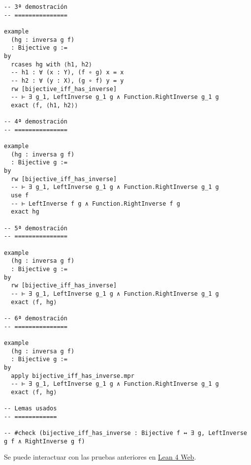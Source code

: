 \begin{verbatim}
-- 3ª demostración
-- ===============

example
  (hg : inversa g f)
  : Bijective g :=
by
  rcases hg with ⟨h1, h2⟩
  -- h1 : ∀ (x : Y), (f ∘ g) x = x
  -- h2 : ∀ (y : X), (g ∘ f) y = y
  rw [bijective_iff_has_inverse]
  -- ⊢ ∃ g_1, LeftInverse g_1 g ∧ Function.RightInverse g_1 g
  exact ⟨f, ⟨h1, h2⟩⟩

-- 4ª demostración
-- ===============

example
  (hg : inversa g f)
  : Bijective g :=
by
  rw [bijective_iff_has_inverse]
  -- ⊢ ∃ g_1, LeftInverse g_1 g ∧ Function.RightInverse g_1 g
  use f
  -- ⊢ LeftInverse f g ∧ Function.RightInverse f g
  exact hg

-- 5ª demostración
-- ===============

example
  (hg : inversa g f)
  : Bijective g :=
by
  rw [bijective_iff_has_inverse]
  -- ⊢ ∃ g_1, LeftInverse g_1 g ∧ Function.RightInverse g_1 g
  exact ⟨f, hg⟩

-- 6ª demostración
-- ===============

example
  (hg : inversa g f)
  : Bijective g :=
by
  apply bijective_iff_has_inverse.mpr
  -- ⊢ ∃ g_1, LeftInverse g_1 g ∧ Function.RightInverse g_1 g
  exact ⟨f, hg⟩

-- Lemas usados
-- ============

-- #check (bijective_iff_has_inverse : Bijective f ↔ ∃ g, LeftInverse g f ∧ RightInverse g f)
\end{verbatim}
Se puede interactuar con las pruebas anteriores en \href{https://lean.math.hhu.de/\#url=https://raw.githubusercontent.com/jaalonso/Calculemus2/main/src/La\_inversa\_de\_una\_funcion\_biyectiva\_es\_biyectiva.lean}{Lean 4 Web}.


